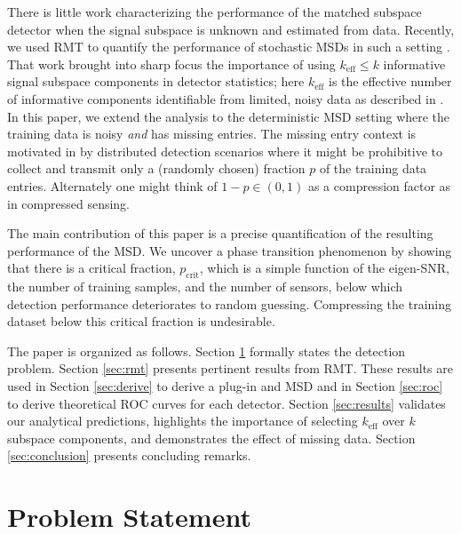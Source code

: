 There is little work characterizing the performance of the matched subspace detector when the signal subspace is unknown and estimated from data. Recently, we used RMT to quantify the performance of stochastic MSDs in such a setting  \cite{asendorf2011msd}. That work brought into sharp focus the importance of using $k_\text{eff}\leq k$ informative signal subspace components in detector statistics; here $k_{\text{eff}}$ is the effective number of informative components identifiable from limited, noisy data as described in \cite{nadakuditi2008sample}. In this paper, we extend the analysis to the deterministic MSD setting where the training data is noisy \textit{and} has missing entries. The missing entry context is motivated in \cite{balzano2010high} by distributed detection scenarios where it might be prohibitive to collect and transmit only a (randomly chosen) fraction $p$ of the training data entries. Alternately one might think of $1-p \in (0,1)$ as a compression factor as in compressed sensing.

The main contribution of this paper is a precise quantification of the resulting performance of the MSD. We uncover a phase transition phenomenon by showing that there is a critical fraction, $p_\text{crit}$, which is a simple function of the eigen-SNR, the number of training samples, and the number of sensors, below which detection performance deteriorates to random guessing. Compressing the training dataset below this critical fraction is undesirable.

The paper is organized as follows. Section \ref{sec:prob stat} formally states the detection problem. Section \ref{sec:rmt} presents pertinent results from RMT. These results are used in Section \ref{sec:derive} to derive a plug-in and \DIFdelbegin {}\DIFdelend \DIFaddbegin {}\DIFaddend MSD and in Section \ref{sec:roc} to derive theoretical ROC curves for each detector. Section \ref{sec:results} validates our analytical predictions, highlights the importance of selecting $k_\text{eff}$ over $k$ subspace components, and demonstrates the effect of missing data. Section \ref{sec:conclusion} presents concluding remarks.

\section{Problem Statement}\label{sec:prob stat}

